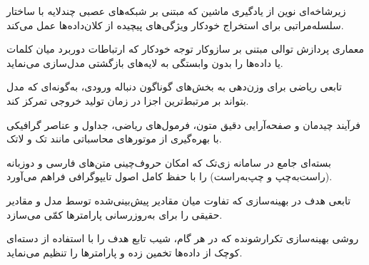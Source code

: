 
\begin{descriptiveglossary}
\item[یادگیری عمیق:] زیرشاخه‌ای نوین از یادگیری ماشین که مبتنی بر شبکه‌های عصبی چندلایه با ساختار سلسله‌مراتبی برای استخراج خودکار ویژگی‌های پیچیده از کلان‌داده‌ها عمل می‌کند.

\item[مدل ترنسفورمر:] معماری پردازش توالی مبتنی بر سازوکار توجه خودکار که ارتباطات دوربرد میان کلمات یا داده‌ها را بدون وابستگی به لایه‌های بازگشتی مدل‌سازی می‌نماید.

\item[سازوکار توجه:] تابعی ریاضی برای وزن‌دهی به بخش‌های گوناگون دنباله ورودی، به‌گونه‌ای که مدل بتواند بر مرتبط‌ترین اجزا در زمان تولید خروجی تمرکز کند.

\item[حروف‌چینی دیجیتال:] فرآیند چیدمان و صفحه‌آرایی دقیق متون، فرمول‌های ریاضی، جداول و عناصر گرافیکی با بهره‌گیری از موتورهای محاسباتی مانند تک و لاتک.

\item[زی‌پرشین:] بسته‌ای جامع در سامانه زی‌تک که امکان حروف‌چینی متن‌های فارسی و دوزبانه (راست‌به‌چپ و چپ‌به‌راست) را با حفظ کامل اصول تایپوگرافی فراهم می‌آورد.

\item[تابع زیان:] تابعی هدف در بهینه‌سازی که تفاوت میان مقادیر پیش‌بینی‌شده توسط مدل و مقادیر حقیقی را برای به‌روزرسانی پارامترها کمّی می‌سازد.

\item[گرادیان کاهشی تصادفی:] روشی بهینه‌سازی تکرارشونده که در هر گام، شیب تابع هدف را با استفاده از دسته‌ای کوچک از داده‌ها تخمین زده و پارامترها را تنظیم می‌نماید.
\end{descriptiveglossary}

